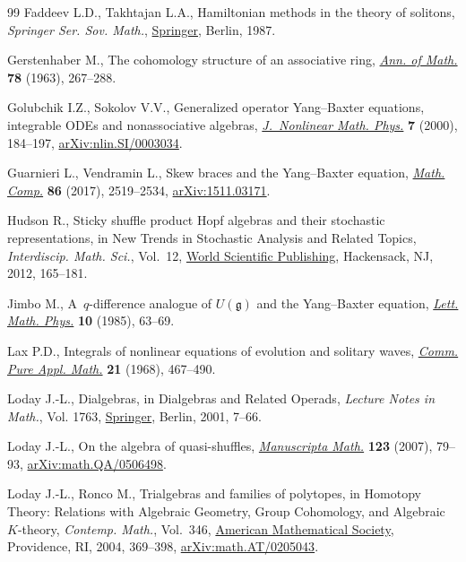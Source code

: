 \begin{thebibliography}{99}
Faddeev L.D., Takhtajan L.A., Hamiltonian methods in the theory of solitons,
 \textit{Springer Ser. Sov. Math.},
 \href{https://doi.org/10.1007/978-3-540-69969-9}{Springer}, Berlin, 1987.

Gerstenhaber M., The cohomology structure of an associative ring,
 \href{https://doi.org/10.2307/1970343}{\textit{Ann. of Math.}} \textbf{78}
 (1963), 267--288.

Golubchik I.Z., Sokolov V.V., Generalized operator {Y}ang--{B}axter equations,
 integrable {ODE}s and nonassociative algebras,
 \href{https://doi.org/10.2991/jnmp.2000.7.2.8}{\textit{J.~Nonlinear Math.
 Phys.}} \textbf{7} (2000), 184--197,
 \href{http://arxiv.org/abs/nlin.SI/0003034}{arXiv:nlin.SI/0003034}.

Guarnieri L., Vendramin L., Skew braces and the {Y}ang--{B}axter equation,
 \href{https://doi.org/10.1090/mcom/3161}{\textit{Math. Comp.}} \textbf{86}
 (2017), 2519--2534, \href{http://arxiv.org/abs/1511.03171}{arXiv:1511.03171}.

Hudson R., Sticky shuffle product {H}opf algebras and their stochastic
 representations, in New Trends in Stochastic Analysis and Related Topics,
 \textit{Interdiscip. Math. Sci.}, Vol.~12,
 \href{https://doi.org/10.1142/9789814360920_0006}{World Scientific
 Publishing}, Hackensack, NJ, 2012, 165--181.

Jimbo M., A~{$q$}-difference analogue of {$U({\mathfrak g})$} and the
 {Y}ang--{B}axter equation,
 \href{https://doi.org/10.1007/BF00704588}{\textit{Lett. Math. Phys.}}
 \textbf{10} (1985), 63--69.

Lax P.D., Integrals of nonlinear equations of evolution and solitary waves,
 \href{https://doi.org/10.1002/cpa.3160210503}{\textit{Comm. Pure Appl.
 Math.}} \textbf{21} (1968), 467--490.

Loday J.-L., Dialgebras, in Dialgebras and Related Operads, \textit{Lecture
 Notes in Math.}, Vol. 1763,
 \href{https://doi.org/10.1007/3-540-45328-8_2}{Springer}, Berlin, 2001,
 7--66.

Loday J.-L., On the algebra of quasi-shuffles,
 \href{https://doi.org/10.1007/s00229-007-0086-2}{\textit{Manuscripta Math.}}
 \textbf{123} (2007), 79--93,
 \href{http://arxiv.org/abs/math.QA/0506498}{arXiv:math.QA/0506498}.

Loday J.-L., Ronco M., Trialgebras and families of polytopes, in Homotopy
 Theory: Relations with Algebraic Geo\-metry, Group Cohomology, and Algebraic
 {$K$}-theory, \textit{Contemp. Math.}, Vol.~346,
 \href{https://doi.org/10.1090/conm/346/06296}{American Mathematical Society},
 Providence, RI, 2004, 369--398,
 \href{http://arxiv.org/abs/math.AT/0205043}{arXiv:math.AT/0205043}.


\end{thebibliography}
